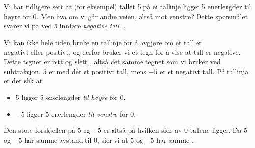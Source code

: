 




	
	\section{\negintro}
	Vi har tidligere sett at (for eksempel) tallet 5 på ei tallinje ligger 5 enerlengder til høyre for 0. 
	Men hva om vi går andre veien, altså mot venstre? Dette spørsmålet svarer vi på ved å innføre \textit{negative tall}. .\regv
	
	\vsk 
	Vi kan ikke hele tiden bruke en tallinje for å avgjøre om et tall er\\ negativt eller positivt, og derfor bruker vi et tegn for å vise at tall er negative. Dette tegnet er rett og slett \sym{$ - $}, altså det samme tegnet som vi bruker ved subtraksjon. $ 5 $ er med dét et positivt tall, mens $ -5 $ er et negativt tall. På tallinja er det slik at
	\begin{itemize}
		\item 5 ligger 5 enerlengder \textsl{til høyre} for 0.
		\item $ -5 $ ligger 5 enerlengder \textsl{til venstre} for 0.
	\end{itemize}
	Den store forskjellen på $ 5 $ og $ -5 $ er altså på hvilken side av 0 tallene ligger. Da $ 5 $ og $ -5 $ har samme avstand til 0, sier vi at $ 5 $ og $ -5 $ har samme . \regv
	
	\eks[1]{ \vs \vs
		\[ |27|=27 \]
	}
	\eks[2]{ \vs \vs
		\[\left|-27\right|=27 \]
	}
	\newpage
